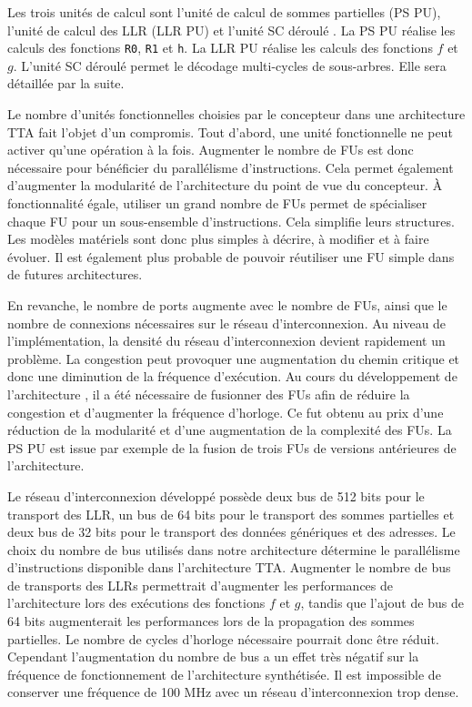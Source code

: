 Les trois unités de calcul sont l'unité de calcul de sommes partielles (PS PU), l'unité de calcul des LLR (LLR PU) et l'unité \og SC déroulé \fg. La PS PU réalise les calculs des fonctions \texttt{R0}, \texttt{R1} et \texttt{h}. La LLR PU réalise les calculs des fonctions $f$ et $g$. L'unité \og SC déroulé \fg permet le décodage multi-cycles de sous-arbres. Elle sera détaillée par la suite. 

Le nombre d'unités fonctionnelles choisies par le concepteur dans une architecture TTA fait l'objet d'un compromis.
Tout d'abord, une unité fonctionnelle ne peut activer qu'une opération à la fois.
Augmenter le nombre de FUs est donc nécessaire pour bénéficier du parallélisme d'instructions.
Cela permet également d'augmenter la modularité de l'architecture du point de vue du concepteur.
\`A fonctionnalité égale, utiliser un grand nombre de FUs permet de spécialiser chaque FU pour un sous-ensemble d'instructions. Cela simplifie leurs structures. Les modèles matériels sont donc plus simples à décrire, à modifier et à faire évoluer. Il est également plus probable de pouvoir réutiliser une FU simple dans de futures architectures.

En revanche, le nombre de ports augmente avec le nombre de FUs, ainsi que le nombre de connexions nécessaires sur le réseau d'interconnexion.
Au niveau de l'implémentation, la densité du réseau d'interconnexion devient rapidement un problème. 
La congestion peut provoquer une augmentation du chemin critique et donc une diminution de la fréquence d'exécution. 
Au cours du développement de l'architecture \TTSC, il a été nécessaire de fusionner des FUs afin de réduire la congestion et d'augmenter la fréquence d'horloge. Ce fut obtenu au prix d'une réduction de la modularité et d'une augmentation de la complexité des FUs. La PS PU est issue par exemple de la fusion de trois FUs de versions antérieures de l'architecture.

Le réseau d'interconnexion développé possède deux bus de 512 bits pour le transport des LLR, un bus de 64 bits pour le transport des sommes partielles et deux bus de 32 bits pour le transport des données génériques et des adresses. Le choix du nombre de bus utilisés dans notre architecture détermine le parallélisme d'instructions disponible dans l'architecture TTA. Augmenter le nombre de bus de transports des LLRs permettrait d'augmenter les performances de l'architecture lors des exécutions des fonctions $f$ et $g$, tandis que l'ajout de bus de 64 bits augmenterait les performances lors de la propagation des sommes partielles. Le nombre de cycles d'horloge nécessaire pourrait donc être réduit. Cependant l'augmentation du nombre de bus a un effet très négatif sur la fréquence de fonctionnement de l'architecture synthétisée. Il est impossible de conserver une fréquence de 100 MHz avec un réseau d'interconnexion trop dense.

